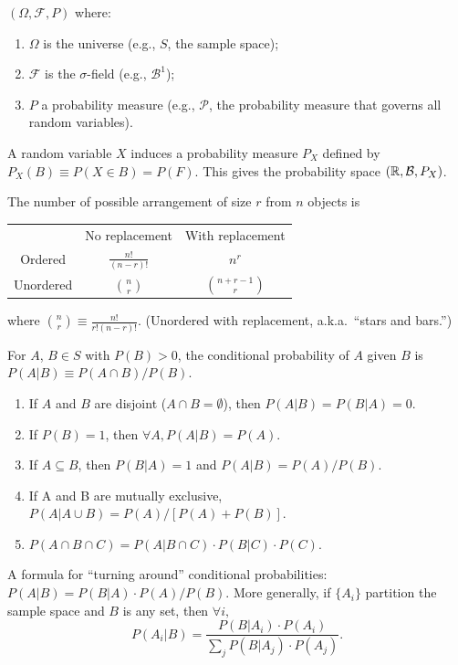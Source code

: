 \documentclass[8pt,letterpaper, landscape]{extarticle} %
\newcommand{\B}{\ensuremath{\mathcal{B}}}
\begin{document}
\begin{multicols}{3}
\begin{description}
 $ (\Omega, \mathcal{F}, P) $ where:
\begin{enumerate}
\item $ \Omega $ is the universe (e.g., $ S $, the sample space);
\item $ \mathcal{F} $ is the $ \sigma $-field (e.g., $ \B^1 $);
\item $ P $ a probability measure (e.g., $ \mathcal{P} $, the probability measure that governs all random variables).
\end{enumerate}
A random variable $ X $ induces a probability measure $ P_X $ defined by $ P_X (B) \equiv P(X \in B) = P(F) $. This gives the probability space $ (\R, \B, P_X) $.

 The number of possible arrangement of size $ r $ from $ n $ objects is
\begin{center}
\begin{tabular}{ccc}
\hline
 & No replacement & With replacement \\
Ordered & $ \frac{n!}{(n-r)!} $ & $ n^r $ \\
Unordered & $ \binom{n}{r} $ & $ \binom{n+r-1}{r} $  \\
\hline
\end{tabular}
\end{center}
where $ \binom{n}{r} \equiv \frac{n!}{r! (n-r)!} $. (Unordered with replacement, a.k.a.\ ``stars and bars.'')

 For $ A $, $ B \in S $ with $ P(B) > 0 $, the conditional probability of $ A $ given $ B $ is $ P(A|B) \equiv P(A \cap B) / P(B) $.
\begin{enumerate}
\item If $ A $ and $ B $ are disjoint ($ A \cap B = \emptyset $), then $ P(A|B) = P(B|A) = 0 $.
\item If $ P(B) = 1 $, then $ \forall A, P(A|B) = P(A) $.
\item If $ A \subseteq B $, then $ P(B|A) = 1 $ and $ P(A|B) = P(A)/P(B) $.
\item If A and B are mutually exclusive, $ P(A|A \cup B) = P(A) / [P(A) + P(B)] $.
\item $ P (A \cap B \cap C) = P(A|B \cap C) \cdot P(B|C) \cdot P(C) $.
\end{enumerate}

 A formula for ``turning around'' conditional probabilities: $ P (A|B) = P(B|A) \cdot P(A) / P(B) $. More generally, if $ \{ A_i \} $ partition the sample space and $ B $ is any set, then $ \forall i, $ $$ P(A_i | B) = \frac{P(B|A_i) \cdot P(A_i)}{\sum_j P(B|A_j) \cdot P(A_j)}. $$


\end{description}
\end{multicols}
\end{document}
